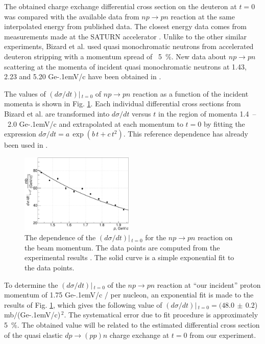 \documentclass[twocolumn,epjc3]{svjour3}
\newcommand{\np}     {\ensuremath{np \rightarrow pn}\xspace}
\newcommand{\dpchex} {\ensuremath{dp \rightarrow (pp)n}\xspace}
\newcommand{\GeVc}   {Ge\kern-.1emV/c\xspace}
\providecommand{\DIFaddtex}[1]{{\protect\color{Green} \sf #1}} %
\providecommand{\DIFdeltex}[1]{{\protect\color{Red} \scriptsize #1}} %
\providecommand{\DIFaddbegin}{} %
\providecommand{\DIFaddend}{} %
\providecommand{\DIFdelbegin}{} %
\providecommand{\DIFdelend}{} %
\providecommand{\DIFaddbeginFL}{} %
\providecommand{\DIFaddendFL}{} %
\providecommand{\DIFdelendFL}{} %
\providecommand{\DIFadd}[1]{\texorpdfstring{\DIFaddtex{#1}}{#1}} %
\providecommand{\DIFdel}[1]{\texorpdfstring{\DIFdeltex{#1}}{}} %
\newcommand{\DIFscaledelfig}{0.5}
\newlength{\DIFdelgraphicswidth} %
\newlength{\DIFdelgraphicsheight} %
\newcommand{\DIFaddincludegraphics}[2][]{{\color{blue}\fbox{\DIFOincludegraphics[#1]{#2}}}} %
\newcommand{\DIFdelincludegraphics}[2][]{%
\sbox{\DIFdelgraphicsbox}{\DIFOincludegraphics[#1]{#2}}%
\settoboxwidth{\DIFdelgraphicswidth}{\DIFdelgraphicsbox} %
\settoboxtotalheight{\DIFdelgraphicsheight}{\DIFdelgraphicsbox} %
\scalebox{\DIFscaledelfig}{%
\parbox[b]{\DIFdelgraphicswidth}{\usebox{\DIFdelgraphicsbox}\\[-\baselineskip] \rule{\DIFdelgraphicswidth}{0em}}\llap{\resizebox{\DIFdelgraphicswidth}{\DIFdelgraphicsheight}{%
\setlength{\unitlength}{\DIFdelgraphicswidth}%
\begin{picture}(1,1)%
\thicklines\linethickness{2pt} %
{\color[rgb]{1,0,0}\put(0,0){\framebox(1,1){}}}%
{\color[rgb]{1,0,0}\put(0,0){\line( 1,1){1}}}%
{\color[rgb]{1,0,0}\put(0,1){\line(1,-1){1}}}%
\end{picture}%
}\hspace*{3pt}}} %
} %
\DeclareRobustCommand{\DIFaddbegin}{\DIFOaddbegin \let\includegraphics\DIFaddincludegraphics} %
\DeclareRobustCommand{\DIFaddend}{\DIFOaddend \let\includegraphics\DIFOincludegraphics} %
\DeclareRobustCommand{\DIFdelbegin}{\DIFOdelbegin \let\includegraphics\DIFdelincludegraphics} %
\DeclareRobustCommand{\DIFdelend}{\DIFOaddend \let\includegraphics\DIFOincludegraphics} %
\DeclareRobustCommand{\DIFaddbeginFL}{\DIFOaddbeginFL \let\includegraphics\DIFaddincludegraphics} %
\DeclareRobustCommand{\DIFaddendFL}{\DIFOaddendFL \let\includegraphics\DIFOincludegraphics} %
\DeclareRobustCommand{\DIFdelendFL}{\DIFOaddendFL \let\includegraphics\DIFOincludegraphics} %
\begin{document}
\DIFdelend The obtained charge exchange differential cross section on the deuteron at $t=0$
was compared with the available data from \np reaction at the same interpolated
energy from published data. The closest energy data comes from measurements made
at the SATURN accelerator \cite{biz75,bys78}. Unlike to the other similar
experiments, Bizard et al. \cite{biz75} used quasi monochromatic neutrons from
accelerated deuteron stripping with a momentum spread of\DIFaddbegin \DIFadd{~}\DIFaddend 5~\%. New data about
\np scattering at the momenta of incident quasi monochromatic neutrons at 1.43,
2.23 and 5.20 \GeVc have been obtained in \cite{tro14}.

The values of $(d\sigma/dt)|\,_{t=0}$ of \np reaction as a function of the
incident momenta is shown in Fig. \ref{fig:npsigma}. Each individual
differential cross sections from Bizard et al. \cite{biz75} are transformed into
$d\sigma/dt$ versus $t$ in the region of momenta 1.4~--~2.0 \GeVc and
extrapolated at each momentum to $t=0$ by fitting the expression
$d\sigma/dt = a\,\exp(b\,t + c\,t^2)$. \DIFaddbegin \DIFadd{This reference dependence has already
been used in \cite{gla08}.
}\DIFaddend 

\DIFdelbegin %
\DIFdelendFL \DIFaddbeginFL \begin{figure}[h]
  \DIFaddendFL \centering
  \includegraphics[width=0.48\textwidth]{np_dSigma.pdf}
  \caption{The dependence of the $(d\sigma/dt)|\,_{t=0}$ for the \np reaction on
    the beam momentum. The data points are computed from the experimental
    results \cite{biz75}. The solid curve is a simple exponential fit to the
    data points.}
  \label{fig:npsigma}
\end{figure}

To determine the $(d\sigma/dt)|\,_{t=0}$ of the \np reaction at ``our incident''
proton momentum of 1.75 \GeVc \DIFdelbegin \DIFdel{/}\DIFdelend \DIFaddbegin \DIFadd{per }\DIFaddend nucleon, an exponential fit is made to the
results of Fig. \ref{fig:npsigma}, which gives the following value of
$(d\sigma/dt)|\,_{t=0} = (48.0\,\pm\,0.2$) mb$/$(\GeVc)$^{\,2}$. The
systematical error due to fit procedure is approximately 5~\%. The obtained
value will be related to the estimated differential cross section of the quasi
elastic \dpchex charge exchange at $t=0$ from our experiment.
\end{document}
